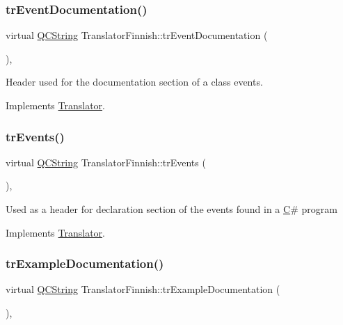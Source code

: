 \subsubsection{\texorpdfstring{trEventDocumentation()}{trEventDocumentation()}}
{\footnotesize\ttfamily virtual \mbox{\hyperlink{class_q_c_string}{Q\+C\+String}} Translator\+Finnish\+::tr\+Event\+Documentation (\begin{DoxyParamCaption}{ }\end{DoxyParamCaption})\hspace{0.3cm}{\ttfamily [inline]}, {\ttfamily [virtual]}}

Header used for the documentation section of a class\textquotesingle{} events. 

Implements \mbox{\hyperlink{class_translator}{Translator}}.

\mbox{\label{class_translator_finnish_aee02d83031bf92c40af07cef17e63b06}} 
\subsubsection{\texorpdfstring{trEvents()}{trEvents()}}
{\footnotesize\ttfamily virtual \mbox{\hyperlink{class_q_c_string}{Q\+C\+String}} Translator\+Finnish\+::tr\+Events (\begin{DoxyParamCaption}{ }\end{DoxyParamCaption})\hspace{0.3cm}{\ttfamily [inline]}, {\ttfamily [virtual]}}

Used as a header for declaration section of the events found in a \mbox{\hyperlink{class_c}{C}}\# program 

Implements \mbox{\hyperlink{class_translator}{Translator}}.

\mbox{\label{class_translator_finnish_aa684912e698b526e63cfbb09fe3bf692}} 
\subsubsection{\texorpdfstring{trExampleDocumentation()}{trExampleDocumentation()}}
{\footnotesize\ttfamily virtual \mbox{\hyperlink{class_q_c_string}{Q\+C\+String}} Translator\+Finnish\+::tr\+Example\+Documentation (\begin{DoxyParamCaption}{ }\end{DoxyParamCaption})\hspace{0.3cm}{\ttfamily [inline]}, {\ttfamily [virtual]}}

